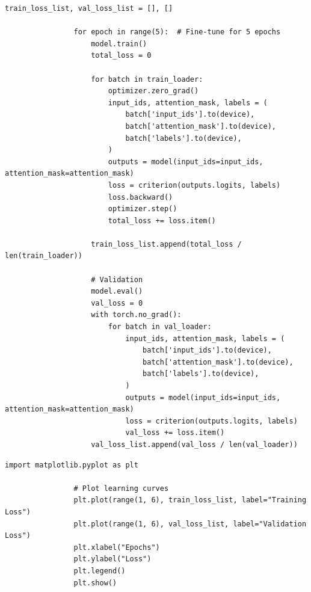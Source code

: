             \begin{lstlisting}[caption={Fine-tune BERT model}, label={lst:bert_fine_tune}]
                train_loss_list, val_loss_list = [], []

                for epoch in range(5):  # Fine-tune for 5 epochs
                    model.train()
                    total_loss = 0

                    for batch in train_loader:
                        optimizer.zero_grad()
                        input_ids, attention_mask, labels = (
                            batch['input_ids'].to(device),
                            batch['attention_mask'].to(device),
                            batch['labels'].to(device),
                        )
                        outputs = model(input_ids=input_ids, attention_mask=attention_mask)
                        loss = criterion(outputs.logits, labels)
                        loss.backward()
                        optimizer.step()
                        total_loss += loss.item()

                    train_loss_list.append(total_loss / len(train_loader))

                    # Validation
                    model.eval()
                    val_loss = 0
                    with torch.no_grad():
                        for batch in val_loader:
                            input_ids, attention_mask, labels = (
                                batch['input_ids'].to(device),
                                batch['attention_mask'].to(device),
                                batch['labels'].to(device),
                            )
                            outputs = model(input_ids=input_ids, attention_mask=attention_mask)
                            loss = criterion(outputs.logits, labels)
                            val_loss += loss.item()
                    val_loss_list.append(val_loss / len(val_loader))
            \end{lstlisting}
            
            \vspace{0.5em}
            
            \begin{lstlisting}[caption={Plot learning curves}, label={lst:plot_learning_curves}]
                import matplotlib.pyplot as plt

                # Plot learning curves
                plt.plot(range(1, 6), train_loss_list, label="Training Loss")
                plt.plot(range(1, 6), val_loss_list, label="Validation Loss")
                plt.xlabel("Epochs")
                plt.ylabel("Loss")
                plt.legend()
                plt.show()
            \end{lstlisting}
